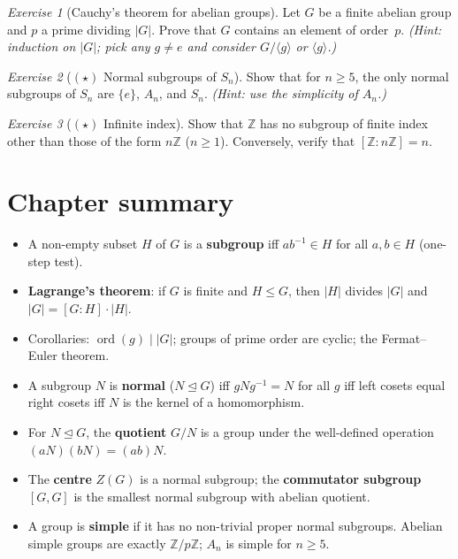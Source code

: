 \documentclass[12pt,a4paper,openany]{book}
\theoremstyle{definition}
\theoremstyle{remark}
\newtheorem{exercise}{Exercise}[chapter]
\newcommand{\Z}{\mathbb{Z}}
\DeclareMathOperator{\ord}{ord}
\begin{document}
\begin{exercise}[Cauchy's theorem for abelian groups]
\label{exer:ch2-10}
Let $G$ be a finite abelian group and $p$ a prime dividing $|G|$.  Prove
that $G$ contains an element of order~$p$.
\textit{(Hint: induction on $|G|$; pick any $g\neq e$ and consider
$G/\langle g\rangle$ or $\langle g\rangle$.)}
\end{exercise}

\begin{exercise}[$(\star)$ Normal subgroups of $S_n$]
\label{exer:ch2-11}
Show that for $n\ge 5$, the only normal subgroups of $S_n$ are $\{e\}$,
$A_n$, and $S_n$.
\textit{(Hint: use the simplicity of $A_n$.)}
\end{exercise}

\begin{exercise}[$(\star)$ Infinite index]
\label{exer:ch2-12}
Show that $\Z$ has no subgroup of finite index other than those of the form
$n\Z$ ($n\ge 1$).  Conversely, verify that $[\Z:n\Z]=n$.
\end{exercise}

\section*{Chapter summary}

\begin{itemize}[leftmargin=2em]
  \item A non-empty subset $H$ of $G$ is a \textbf{subgroup} iff
    $ab^{-1}\in H$ for all $a,b\in H$ (one-step test).
  \item \textbf{Lagrange's theorem}: if $G$ is finite and $H\le G$, then
    $|H|$ divides $|G|$ and $|G|=[G:H]\cdot|H|$.
  \item Corollaries: $\ord(g)\mid|G|$; groups of prime order are cyclic;
    the Fermat--Euler theorem.
  \item A subgroup $N$ is \textbf{normal} ($N\trianglelefteq G$) iff
    $gNg^{-1}=N$ for all $g$ iff left cosets equal right cosets iff $N$ is
    the kernel of a homomorphism.
  \item For $N\trianglelefteq G$, the \textbf{quotient} $G/N$ is a group
    under the well-defined operation $(aN)(bN)=(ab)N$.
  \item The \textbf{centre} $Z(G)$ is a normal subgroup; the
    \textbf{commutator subgroup} $[G,G]$ is the smallest normal subgroup
    with abelian quotient.
  \item A group is \textbf{simple} if it has no non-trivial proper normal
    subgroups.  Abelian simple groups are exactly $\Z/p\Z$; $A_n$ is simple
    for $n\ge 5$.
\end{itemize}
\end{document}
